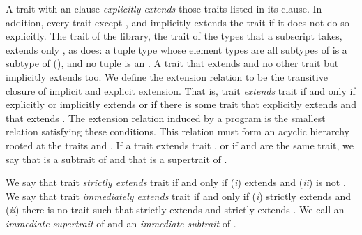 A trait with an  clause
\emph{explicitly extends} those traits listed in its  clause.
In addition, every trait except ,  and 
implicitly extends the trait 
if it does not do so explicitly.
The trait  of the library, the trait of the types that a
subscript takes, extends only , as  does:
a tuple type whose element types are all subtypes of 
is a subtype of  (), and no tuple is an
.
A trait that extends  and no other trait but 
implicitly extends  too.
We define the extension relation to be the transitive closure
of implicit and
explicit extension.
That is, trait  \emph{extends} trait 
if and only if  explicitly or implicitly
extends  or if there is some trait 
that  explicitly extends and that extends .
The extension relation induced by a program is the smallest
relation satisfying these conditions.
This relation must form an acyclic hierarchy
rooted at the traits  and .
If a trait  extends trait ,
or if  and  are the same trait,
we say that  is a subtrait of 
and that  is a supertrait of .

We say that trait  \emph{strictly extends} trait 
if and only if
(\emph{i})  extends  and (\emph{ii})  is not .
We say that trait  \emph{immediately extends} trait 
if and only if (\emph{i})  strictly extends  and
(\emph{ii}) there is no trait 
such that  strictly extends 
and  strictly extends .
We call  an \emph{immediate supertrait} of 
and  an \emph{immediate subtrait} of .

